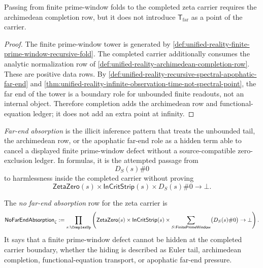 \begin{theorem}
\label{thm:unified-reality-completion-not-point-reification}
Passing from finite prime-window folds to the completed zeta carrier
requires the archimedean completion row, but it does not introduce
$\mathsf{T}_{\mathrm{far}}$ as a point of the carrier.
\end{theorem}

\begin{proof}
The finite prime-window tower is generated by
\autoref{def:unified-reality-finite-prime-window-recursive-fold}.  The
completed carrier additionally consumes the analytic normalization row
of \autoref{def:unified-reality-archimedean-completion-row}.  These are
positive data rows.  By
\autoref{def:unified-reality-recursive-spectral-apophatic-far-end} and
\autoref{thm:unified-reality-infinite-observation-time-not-spectral-point},
the far end of the tower is a boundary role for unbounded finite
readouts, not an internal object.  Therefore completion adds the
archimedean row and functional-equation ledger; it does not add an
extra point at infinity.
\end{proof}

\begin{definition}
\label{def:unified-reality-far-end-absorption}
\emph{Far-end absorption} is the illicit inference pattern that treats
the unbounded tail, the archimedean row, or the apophatic far-end role as
a hidden term able to cancel a displayed finite prime-window defect
without a source-compatible zero-exclusion ledger.  In formulas, it is
the attempted passage from
$$
D_S(s)\#0
$$
to harmlessness inside the completed carrier without proving
$$
\mathsf{ZetaZero}(s)
\times
\mathsf{InCritStrip}(s)
\times
D_S(s)\#0
\to
\bot.
$$
\end{definition}

\begin{definition}
\label{def:unified-reality-no-far-end-absorption}
The \emph{no far-end absorption} row for the zeta carrier is
$$
\mathsf{NoFarEndAbsorption}_{\zeta}
:=
\prod_{s:\ComplexUp}
\left(
\mathsf{ZetaZero}(s)
\times
\mathsf{InCritStrip}(s)
\times
\sum_{S:\mathsf{FinitePrimeWindow}}
\bigl(D_S(s)\#0\bigr)
\to
\bot
\right).
$$
It says that a finite prime-window defect cannot be hidden at the
completed carrier boundary, whether the hiding is described as Euler
tail, archimedean completion, functional-equation transport, or
apophatic far-end pressure.
\end{definition}

